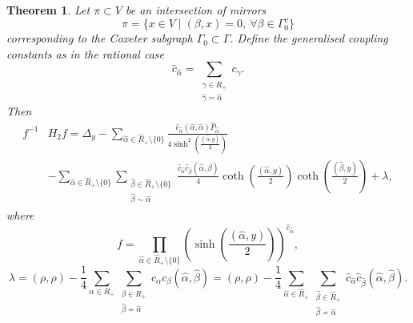\documentclass[12pt]{amsart}
\numberwithin{equation}{section}
\newtheorem{theorem}{Theorem}[section]
\theoremstyle{definition}
\begin{document}
\begin{theorem}\label{trigpot}
Let $\pi \subset V$ be an intersection of mirrors
\begin{equation*}
    \pi = \{x \in V \mid (\beta, x) = 0, \ \forall \beta \in \Gamma^v_0 \}
\end{equation*}
corresponding to the Coxeter subgraph $\Gamma_0 \subset \Gamma$. 
Define the generalised coupling constants as in the rational case
\begin{equation*}
    \widehat{c}_{\widehat{\alpha}} = \sum\limits_{\substack{\gamma \in R_{+} \\ \widehat{\gamma} = \widehat{\alpha}}} c_{\gamma}.
\end{equation*}
Then
\begin{align*}
    f^{-1} &H_2 f = \Delta_y - \sum\limits_{\widehat{\alpha} \in \widehat{R}_+ \setminus \{0\} }\frac{\widehat{c}_{\widehat{\alpha}} (\widehat{\alpha},\widehat{\alpha})\widehat{P}_{\widehat{\alpha}}}{4 \sinh^2 \left(\frac{(\widehat{\alpha},y)}{2}\right)} 
    \\
    &- \sum\limits_{\widehat{\alpha} \in \widehat{R}_+ \setminus \{0\} } \sum\limits_{\substack{\widehat\beta \in \widehat{R}_+ \setminus \{0\} \\\widehat{\beta} \sim \widehat{\alpha}}}\frac{\widehat{c}_{\widehat{\alpha}} \widehat{c}_{\widehat{\beta}}(\widehat{\alpha}, \widehat{\beta})}{4} \coth\left(\frac{(\widehat{\alpha},y)}{2}\right) \coth\left(\frac{(\widehat{\beta},y)}{2}\right)  + \lambda,
\end{align*}
where 
\begin{equation*}
    f = \prod_{\widehat\alpha \in \widehat{R}_{+} \setminus \{0\}}\left( \sinh\left(\frac{(\widehat{\alpha}, y)}{2}\right)\right)^{\widehat{c}_{\widehat{\alpha}}}, 
\end{equation*}
\begin{equation*}
    \lambda = (\rho, \rho) - \frac14 \sum_{\alpha \in R_+}
    \sum_{\substack{\beta \in R_+ \\  \widehat{\beta} \nsim \widehat{\alpha}}} c_{\alpha} c_{\beta} (\widehat{\alpha}, \widehat{\beta}) 
    = (\rho, \rho) - \frac14 \sum_{\widehat{\alpha} \in \widehat{R}_+}
    \sum_{\substack{\widehat{\beta} \in \widehat{R}_+ \\  \widehat{\beta} \nsim \widehat{\alpha}}} \widehat{c}_{\widehat{\alpha}} \widehat{c}_{\widehat{\beta}} (\widehat{\alpha}, \widehat{\beta}).
\end{equation*}
\end{theorem}
\end{document}
